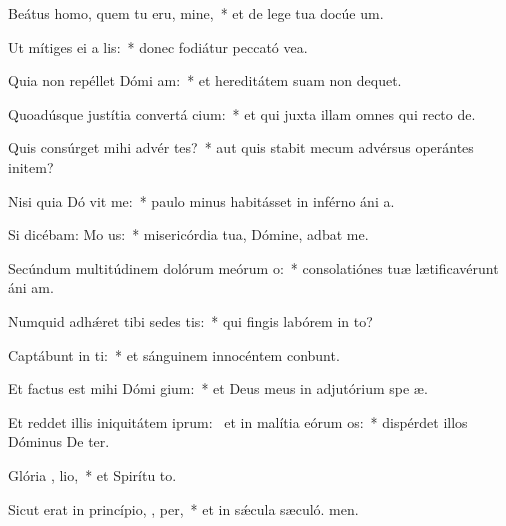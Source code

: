 \item Beátus homo, quem tu eru, mine,~* et de lege tua docúe um.
\item Ut mítiges ei a  lis:~* donec fodiátur peccató vea.
\item Quia non repéllet Dómi  am:~* et hereditátem suam non dequet.
\item Quoadúsque justítia convertá  cium:~* et qui juxta illam omnes qui recto  de.
\item Quis consúrget mihi advér tes?~* aut quis stabit mecum advérsus operántes initem?
\item Nisi quia Dó vit me:~* paulo minus habitásset in inférno áni a.
\item Si dicébam: Mo   us:~* misericórdia tua, Dómine, adbat me.
\item Secúndum multitúdinem dolórum meórum   o:~* consolatiónes tuæ lætificavérunt áni am.
\item Numquid adhǽret tibi sedes tis:~* qui fingis labórem in to?
\item Captábunt in  ti:~* et sánguinem innocéntem conbunt.
\item Et factus est mihi Dómi  gium:~* et Deus meus in adjutórium spe æ.
\item Et reddet illis iniquitátem iprum:~\pscross{} et in malítia eórum  os:~* dispérdet illos Dóminus De ter.
\item Glória ,  lio,~* et Spirítu to.
\item Sicut erat in princípio,  ,  per,~* et in sǽcula sæculó. men.
